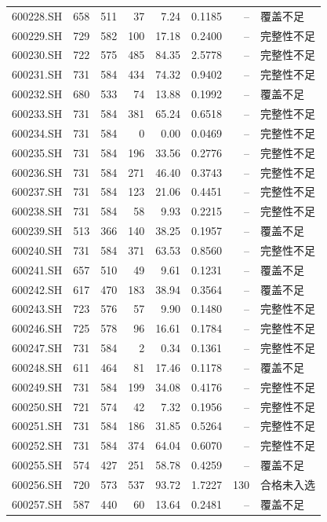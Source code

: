 \documentclass[10pt,a4paper]{article}
\begin{document}
\begin{longtable}{lrrr r r r l}
600228.SH & 658 & 511 & 37 & 7.24 & 0.1185 & -- & 覆盖不足\\
600229.SH & 729 & 582 & 100 & 17.18 & 0.2400 & -- & 完整性不足\\
600230.SH & 722 & 575 & 485 & 84.35 & 2.5778 & -- & 完整性不足\\
600231.SH & 731 & 584 & 434 & 74.32 & 0.9402 & -- & 完整性不足\\
600232.SH & 680 & 533 & 74 & 13.88 & 0.1992 & -- & 覆盖不足\\
600233.SH & 731 & 584 & 381 & 65.24 & 0.6518 & -- & 完整性不足\\
600234.SH & 731 & 584 & 0 & 0.00 & 0.0469 & -- & 完整性不足\\
600235.SH & 731 & 584 & 196 & 33.56 & 0.2776 & -- & 完整性不足\\
600236.SH & 731 & 584 & 271 & 46.40 & 0.3743 & -- & 完整性不足\\
600237.SH & 731 & 584 & 123 & 21.06 & 0.4451 & -- & 完整性不足\\
600238.SH & 731 & 584 & 58 & 9.93 & 0.2215 & -- & 完整性不足\\
600239.SH & 513 & 366 & 140 & 38.25 & 0.1957 & -- & 覆盖不足\\
600240.SH & 731 & 584 & 371 & 63.53 & 0.8560 & -- & 完整性不足\\
600241.SH & 657 & 510 & 49 & 9.61 & 0.1231 & -- & 覆盖不足\\
600242.SH & 617 & 470 & 183 & 38.94 & 0.3564 & -- & 覆盖不足\\
600243.SH & 723 & 576 & 57 & 9.90 & 0.1480 & -- & 完整性不足\\
600246.SH & 725 & 578 & 96 & 16.61 & 0.1784 & -- & 完整性不足\\
600247.SH & 731 & 584 & 2 & 0.34 & 0.1361 & -- & 完整性不足\\
600248.SH & 611 & 464 & 81 & 17.46 & 0.1178 & -- & 覆盖不足\\
600249.SH & 731 & 584 & 199 & 34.08 & 0.4176 & -- & 完整性不足\\
600250.SH & 721 & 574 & 42 & 7.32 & 0.1956 & -- & 完整性不足\\
600251.SH & 731 & 584 & 186 & 31.85 & 0.5264 & -- & 完整性不足\\
600252.SH & 731 & 584 & 374 & 64.04 & 0.6070 & -- & 完整性不足\\
600255.SH & 574 & 427 & 251 & 58.78 & 0.4259 & -- & 覆盖不足\\
600256.SH & 720 & 573 & 537 & 93.72 & 1.7227 & 130 & 合格未入选\\
600257.SH & 587 & 440 & 60 & 13.64 & 0.2481 & -- & 覆盖不足\\

\end{longtable}
\end{document}

